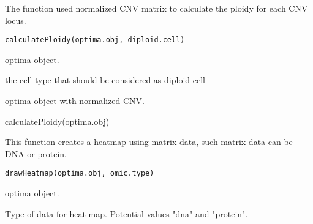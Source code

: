 \documentclass[a4paper]{book}
\begin{document}
%
\begin{Description}\relax
The function used normalized CNV matrix to calculate the ploidy for each CNV locus.
\end{Description}
%
\begin{Usage}
\begin{verbatim}
calculatePloidy(optima.obj, diploid.cell)
\end{verbatim}
\end{Usage}
%
\begin{Arguments}
\begin{ldescription}
\item[\code{optima.obj}] optima object.

\item[\code{diploid.cell}] the cell type that should be considered as diploid cell
\end{ldescription}
\end{Arguments}
%
\begin{Value}
optima object with normalized CNV.
\end{Value}
%
\begin{Examples}
\begin{ExampleCode}
calculatePloidy(optima.obj)
\end{ExampleCode}
\end{Examples}
%
\begin{Description}\relax
This function creates a heatmap using matrix data, such matrix
data can be DNA or protein.
\end{Description}
%
\begin{Usage}
\begin{verbatim}
drawHeatmap(optima.obj, omic.type)
\end{verbatim}
\end{Usage}
%
\begin{Arguments}
\begin{ldescription}
\item[\code{optima.obj}] optima object.

\item[\code{omic.type}] Type of data for heat map. Potential values "dna" and "protein".
\end{ldescription}
\end{Arguments}
\end{document}
